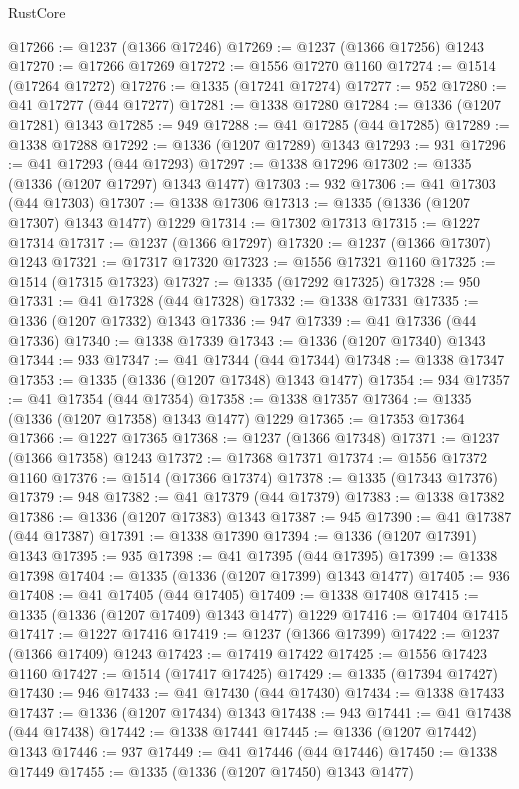 \begin{lexlean}{RustCore}
\begin{coremodule}
@17266 := @1237 (@1366 @17246)
@17269 := @1237 (@1366 @17256) @1243
@17270 := @17266 @17269
@17272 := @1556 @17270 @1160
@17274 := @1514 (@17264 @17272)
@17276 := @1335 (@17241 @17274)
@17277 := 952
@17280 := @41 @17277 (@44 @17277)
@17281 := @1338 @17280
@17284 := @1336 (@1207 @17281) @1343
@17285 := 949
@17288 := @41 @17285 (@44 @17285)
@17289 := @1338 @17288
@17292 := @1336 (@1207 @17289) @1343
@17293 := 931
@17296 := @41 @17293 (@44 @17293)
@17297 := @1338 @17296
@17302 := @1335 (@1336 (@1207 @17297) @1343 @1477)
@17303 := 932
@17306 := @41 @17303 (@44 @17303)
@17307 := @1338 @17306
@17313 := @1335 (@1336 (@1207 @17307) @1343 @1477) @1229
@17314 := @17302 @17313
@17315 := @1227 @17314
@17317 := @1237 (@1366 @17297)
@17320 := @1237 (@1366 @17307) @1243
@17321 := @17317 @17320
@17323 := @1556 @17321 @1160
@17325 := @1514 (@17315 @17323)
@17327 := @1335 (@17292 @17325)
@17328 := 950
@17331 := @41 @17328 (@44 @17328)
@17332 := @1338 @17331
@17335 := @1336 (@1207 @17332) @1343
@17336 := 947
@17339 := @41 @17336 (@44 @17336)
@17340 := @1338 @17339
@17343 := @1336 (@1207 @17340) @1343
@17344 := 933
@17347 := @41 @17344 (@44 @17344)
@17348 := @1338 @17347
@17353 := @1335 (@1336 (@1207 @17348) @1343 @1477)
@17354 := 934
@17357 := @41 @17354 (@44 @17354)
@17358 := @1338 @17357
@17364 := @1335 (@1336 (@1207 @17358) @1343 @1477) @1229
@17365 := @17353 @17364
@17366 := @1227 @17365
@17368 := @1237 (@1366 @17348)
@17371 := @1237 (@1366 @17358) @1243
@17372 := @17368 @17371
@17374 := @1556 @17372 @1160
@17376 := @1514 (@17366 @17374)
@17378 := @1335 (@17343 @17376)
@17379 := 948
@17382 := @41 @17379 (@44 @17379)
@17383 := @1338 @17382
@17386 := @1336 (@1207 @17383) @1343
@17387 := 945
@17390 := @41 @17387 (@44 @17387)
@17391 := @1338 @17390
@17394 := @1336 (@1207 @17391) @1343
@17395 := 935
@17398 := @41 @17395 (@44 @17395)
@17399 := @1338 @17398
@17404 := @1335 (@1336 (@1207 @17399) @1343 @1477)
@17405 := 936
@17408 := @41 @17405 (@44 @17405)
@17409 := @1338 @17408
@17415 := @1335 (@1336 (@1207 @17409) @1343 @1477) @1229
@17416 := @17404 @17415
@17417 := @1227 @17416
@17419 := @1237 (@1366 @17399)
@17422 := @1237 (@1366 @17409) @1243
@17423 := @17419 @17422
@17425 := @1556 @17423 @1160
@17427 := @1514 (@17417 @17425)
@17429 := @1335 (@17394 @17427)
@17430 := 946
@17433 := @41 @17430 (@44 @17430)
@17434 := @1338 @17433
@17437 := @1336 (@1207 @17434) @1343
@17438 := 943
@17441 := @41 @17438 (@44 @17438)
@17442 := @1338 @17441
@17445 := @1336 (@1207 @17442) @1343
@17446 := 937
@17449 := @41 @17446 (@44 @17446)
@17450 := @1338 @17449
@17455 := @1335 (@1336 (@1207 @17450) @1343 @1477)

\end{coremodule}
\end{lexlean}

